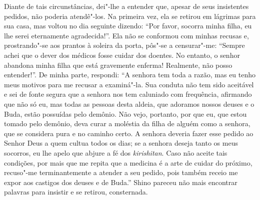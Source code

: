 Diante de tais circunstâncias, dei"-lhe a entender que, apesar de seus
insistentes pedidos, não poderia atendê"-los. Na primeira vez, ela se
retirou em lágrimas para sua casa, mas voltou no dia seguinte dizendo:
``Por favor, socorra minha filha, eu lhe serei eternamente agradecida!''. 
Ela não se conformou com minhas recusas e, prostrando"-se aos prantos à
soleira da porta, pôs"-se a censurar"-me: ``Sempre achei que o dever dos
médicos fosse cuidar dos doentes. No entanto, o senhor abandona minha
filha que está gravemente enferma! Realmente, não posso entender!''. De
minha parte, respondi: ``A senhora tem toda a razão, mas eu tenho meus
motivos para me recusar a examiná"-la. Sua conduta não tem sido
aceitável e sei de fonte segura que a senhora nos tem caluniado com
frequência, afirmando que não só eu, mas todas as pessoas desta aldeia,
que adoramos nossos deuses e o Buda, estão possuídas pelo demônio. Não
vejo, portanto, por que eu, que estou tomado pelo demônio, deva curar a
moléstia da filha de alguém como a senhora, que se considera pura e no
caminho certo. A senhora deveria fazer esse pedido ao Senhor Deus a
quem cultua todos os dias; se a senhora deseja tanto os meus socorros,
eu lhe apelo que abjure a fé dos \textit{kirishitan}. Caso não aceite
tais condições, por mais que me repita que a medicina é a arte de
cuidar do próximo, recuso"-me terminantemente a atender a seu pedido,
pois também receio me expor aos castigos dos deuses e de Buda.'' Shino
pareceu não mais encontrar palavras para insistir e se retirou, consternada.

